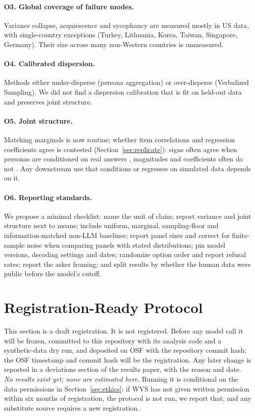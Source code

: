 \documentclass[11pt]{article}
\begin{document}
\paragraph{O3. Global coverage of failure modes.} Variance collapse, acquiescence and sycophancy are measured mostly in US data, with single-country exceptions (Turkey, Lithuania, Korea, Taiwan, Singapore, Germany). Their size across many non-Western countries is unmeasured.

\paragraph{O4. Calibrated dispersion.} Methods either under-disperse (persona aggregation) or over-disperse (Verbalized Sampling). We did not find a dispersion calibration that is fit on held-out data and preserves joint structure.

\paragraph{O5. Joint structure.} Matching marginals is now routine; whether item correlations and regression coefficients agree is contested (Section~\ref{sec:replicate}): signs often agree when personas are conditioned on real answers \citep{lee2026openweight}, magnitudes and coefficients often do not \citep{bisbee2024,williams2026beyond,lukauskas2026}. Any downstream use that conditions or regresses on simulated data depends on it.

\paragraph{O6. Reporting standards.} We propose a minimal checklist: name the unit of claim; report variance and joint structure next to means; include uniform, marginal, sampling-floor and information-matched non-LLM baselines; report panel sizes and correct for finite-sample noise when comparing panels with stated distributions; pin model versions, decoding settings and dates; randomize option order and report refusal rates; report the asker framing; and split results by whether the human data were public before the model's cutoff.

\section{Registration-Ready Protocol}
\label{sec:protocol}

This section is a draft registration. It is not registered. Before any model call it will be frozen, committed to this repository with its analysis code and a synthetic-data dry run, and deposited on OSF with the repository commit hash; the OSF timestamp and commit hash will be the registration. Any later change is reported in a deviations section of the results paper, with the reason and date. \emph{No results exist yet; none are estimated here.} Running it is conditional on the data permissions in Section~\ref{sec:ethics}: if WVS has not given written permission within six months of registration, the protocol is not run, we report that, and any substitute source requires a new registration.
\end{document}
